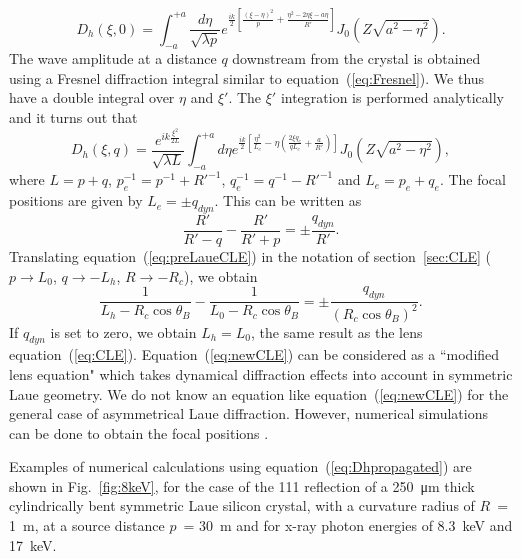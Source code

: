 \documentclass[preprint]{iucr}              %
\begin{document}
\begin{equation}\label{eq:blabla}
    D_h(\xi,0)=\int_{-a}^{+a}\frac{d\eta}{\sqrt{\lambda p}}
    e^{\frac{ik}{2}\left[\frac{(\xi-\eta)^2}{p}+\frac{\eta^2-2\eta\xi-a\eta}{R'}\right]}
    J_0(Z\sqrt{a^2-\eta^2}).
\end{equation}
The wave amplitude at a distance $q$ downstream from the crystal is obtained using a Fresnel diffraction integral similar to equation~(\ref{eq:Fresnel}). We thus have a double integral over $\eta$ and $\xi'$. The $\xi'$ integration is performed analytically \cite{GuigayFerrero2013} and it turns out that
\begin{equation}
\label{eq:Dhpropagated}
    D_h(\xi,q)=
    \frac{e^{i k \frac{\xi^2}{2L}}}{\sqrt{\lambda L}}
    \int_{-a}^{+a} d\eta
    e^{\frac{ik}{2}
    [\frac{\eta^2}{L_e}-\eta(
    \frac{2\xi q_e}{q L_e}+
    \frac{a}{R'}
    )]}
    J_0(Z\sqrt{a^2-\eta^2}),
\end{equation}
where $L=p+q$, $p_e^{-1}=p^{-1}+R'^{-1}$, $q_e^{-1}=q^{-1}-R'^{-1}$ and $L_e=p_e+q_e$. The focal positions are given by $L_{e}=\pm q_{dyn}$.
This can be written as
\begin{equation}
\label{eq:preLaueCLE}
    \frac{R'}{R'-q} - \frac{R'}{R' + p} = \pm \frac{q_{dyn}}{R'}.
\end{equation}
Translating equation~(\ref{eq:preLaueCLE}) in the notation of section~\ref{sec:CLE} ($p \to L_0$, $q \to -L_h$, $R \to -R_c$), we obtain
\begin{equation}
\label{eq:newCLE}
    \frac{1}{L_h-R_c \cos\theta_B} -
    \frac{1}{L_0 - R_c \cos\theta_B} =
    \pm \frac{q_{dyn}}{(R_c \cos\theta_B)^2}.
\end{equation}
If $q_{dyn}$ is set to zero, we obtain $L_h=L_0$, the same result as the lens equation~(\ref{eq:CLE}).
Equation~(\ref{eq:newCLE}) can be considered as a ``modified lens equation" which takes dynamical diffraction effects into account in symmetric Laue geometry.
We do not know an equation like equation~(\ref{eq:newCLE}) for the general case of asymmetrical Laue diffraction. However, numerical simulations can be done to obtain the focal positions \cite{Nesterets,GuigayFerrero2016}.

Examples of numerical calculations using equation~(\ref{eq:Dhpropagated}) are shown in Fig.~\ref{fig:8keV}, for the case of the 111 reflection of a \SI{250}{\micro\meter} thick cylindrically bent symmetric Laue silicon crystal, with a curvature radius of $R$~= \SI{1}{\meter}, at a source distance $p$~= \SI{30}{\meter} and for x-ray photon energies of 8.3~keV and 17~keV. 
\end{document}
